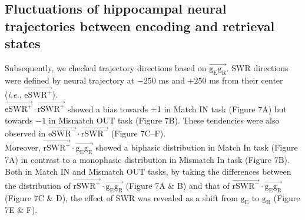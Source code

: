 \documentclass[final,3p,times,twocolumn]{elsarticle}
\begin{document}
\subsection{Fluctuations of hippocampal neural trajectories between encoding and retrieval states}
Subsequently, we checked trajectory directions based on $\overrightarrow{\mathrm{g_{E}g_{R}}}$. SWR directions were defined by neural trajectory at $-250$ ms and $+250$ ms from their center (\textit{i.e.}, $\overrightarrow{\mathrm{eSWR^+}}$).
\\
\indent
$\overrightarrow{\mathrm{eSWR^+}}\cdot\overrightarrow{\mathrm{rSWR^+}}$ showed a bias towards $+1$ in Match IN task (Figure 7A) but towards $-1$ in Mismatch OUT task (Figure 7B). These tendencies were also observed in $\overrightarrow{\mathrm{eSWR^-}}\cdot\overrightarrow{\mathrm{rSWR^-}}$ (Figure 7C--F).
\\
\indent
Moreover, $\overrightarrow{\mathrm{rSWR^+}}\cdot\overrightarrow{\mathrm{g_{E}g_{R}}}$ showed a biphasic distribution in Match In task (Figure 7A) in contrast to a monophasic distribution in Mismatch In task (Figure 7B).
\\
\indent
Both in Match IN and Mismatch OUT tasks, by taking the differences between the distribution of $\overrightarrow{\mathrm{rSWR^+}}\cdot\overrightarrow{\mathrm{g_{E}g_{R}}}$ (Figure 7A \& B) and that of $\overrightarrow{\mathrm{rSWR^-}}\cdot\overrightarrow{\mathrm{g_{E}g_{R}}}$ (Figure 7C \& D), the effect of SWR was revealed as a shift from $\mathrm{g_{E}}$ to $\mathrm{g_{R}}$ (Figure 7E \& F).
\label{sec:results}

\end{document}
